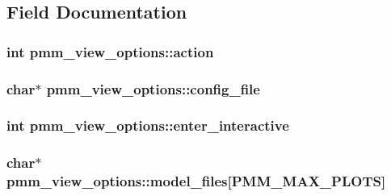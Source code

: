\subsection{Field Documentation}
\hypertarget{structpmm__view__options_aeef62de5e0377da63faaa1aeb35bdbcd}{
\subsubsection[{action}]{\setlength{\rightskip}{0pt plus 5cm}int pmm\-\_\-view\-\_\-options\-::action}}\label{structpmm__view__options_aeef62de5e0377da63faaa1aeb35bdbcd}
\hypertarget{structpmm__view__options_afc11a8cbc3b2d8bb72776dcd194f74a4}{
\subsubsection[{config\-\_\-file}]{\setlength{\rightskip}{0pt plus 5cm}char$\ast$ pmm\-\_\-view\-\_\-options\-::config\-\_\-file}}\label{structpmm__view__options_afc11a8cbc3b2d8bb72776dcd194f74a4}
\hypertarget{structpmm__view__options_ae698b0628d4e12d28d50be208b2ddceb}{
\subsubsection[{enter\-\_\-interactive}]{\setlength{\rightskip}{0pt plus 5cm}int pmm\-\_\-view\-\_\-options\-::enter\-\_\-interactive}}\label{structpmm__view__options_ae698b0628d4e12d28d50be208b2ddceb}
\hypertarget{structpmm__view__options_a5669dcc17daae82740b1a597498b3716}{
\subsubsection[{model\-\_\-files}]{\setlength{\rightskip}{0pt plus 5cm}char$\ast$ pmm\-\_\-view\-\_\-options\-::model\-\_\-files\mbox{[}{\bf P\-M\-M\-\_\-\-M\-A\-X\-\_\-\-P\-L\-O\-T\-S}\mbox{]}}}\label{structpmm__view__options_a5669dcc17daae82740b1a597498b3716}
